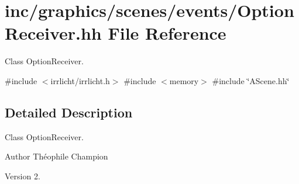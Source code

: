 \hypertarget{OptionReceiver_8hh}{}\section{inc/graphics/scenes/events/\+Option\+Receiver.hh File Reference}
\label{OptionReceiver_8hh}


Class Option\+Receiver.  


{\ttfamily \#include $<$irrlicht/irrlicht.\+h$>$}\newline
{\ttfamily \#include $<$memory$>$}\newline
{\ttfamily \#include \char`\"{}A\+Scene.\+hh\char`\"{}}\newline


\subsection{Detailed Description}
Class Option\+Receiver. 

\begin{DoxyAuthor}{Author}
Théophile Champion 
\end{DoxyAuthor}
\begin{DoxyVersion}{Version}
2. 
\end{DoxyVersion}
